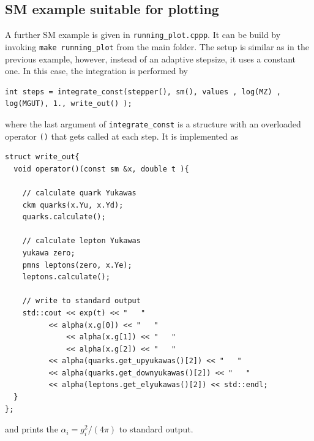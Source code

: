 \documentclass[11pt,a4paper]{article}
\begin{document}
\subsection{\label{sec::sm_plot_example} SM example suitable for plotting}
A further SM example is given in \texttt{running\_plot.cppp}. It can be build by invoking \texttt{make running\_plot} from the main folder.
The setup is similar as in the previous example, however, instead of an adaptive stepsize, it uses a constant one.
In this case, the integration is performed by
\begin{lstlisting}
int steps = integrate_const(stepper(), sm(), values , log(MZ) , log(MGUT), 1., write_out() );
\end{lstlisting}
where the last argument of \texttt{integrate\_const} is a structure with an overloaded operator \texttt{()} that gets called at each step.
It is implemented as
\begin{lstlisting}
struct write_out{
  void operator()(const sm &x, double t ){

    // calculate quark Yukawas
    ckm quarks(x.Yu, x.Yd);
    quarks.calculate();

    // calculate lepton Yukawas
    yukawa zero;
    pmns leptons(zero, x.Ye);
    leptons.calculate();
    
    // write to standard output
    std::cout << exp(t) << "   "
	      << alpha(x.g[0]) << "   "
      	      << alpha(x.g[1]) << "   "
      	      << alpha(x.g[2]) << "   "
	      << alpha(quarks.get_upyukawas()[2]) << "   "
	      << alpha(quarks.get_downyukawas()[2]) << "   "
	      << alpha(leptons.get_elyukawas()[2]) << std::endl;
  }
};
\end{lstlisting}
and prints the $\alpha_i = g_i^2/\left(4\pi\right)$ to standard output.
\end{document}
